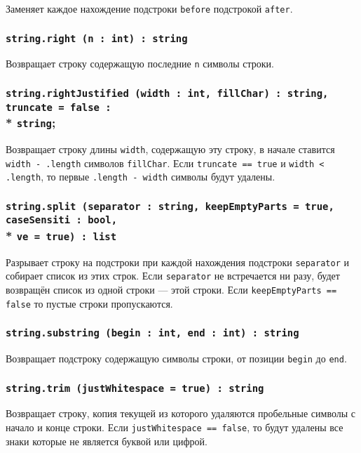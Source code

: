 Заменяет каждое нахождение подстроки \texttt{before} подстрокой \texttt{after}.

\subsubsection{\texttt{string.right (n : int) : string}}

Возвращает строку содержащую последние \texttt{n} символы строки.

\subsubsection{\texttt{string.rightJustified (width : int, fillChar) : string, truncate = false :}\\* \texttt{string};}

Возвращает строку длины \texttt{width}, содержащую эту строку, в начале ставится \texttt{width - .length} символов \texttt{fillChar}. Если \texttt{truncate == true} и \texttt{width < .length}, то первые \texttt{.length - width} символы будут удалены.

\subsubsection{\texttt{string.split (separator : string, keepEmptyParts = true, caseSensiti : bool,}\\* \texttt{ve = true) : list}}

Разрывает строку на подстроки при каждой нахождения подстроки \texttt{separator} и собирает список из этих строк. Если \texttt{separator} не встречается ни разу, будет возвращён список из одной строки — этой строки. Если \texttt{keepEmptyParts == false} то пустые строки пропускаются.

\subsubsection{\texttt{string.substring (begin : int, end : int) : string}}

Возвращает подстроку содержащую символы строки, от позиции \texttt{begin} до \texttt{end}.

\subsubsection{\texttt{string.trim (justWhitespace = true) : string}}

Возвращает строку, копия текущей из которого удаляются пробельные символы с начало и конце строки. Если \texttt{justWhitespace == false}, то будут удалены все знаки которые не является буквой или цифрой.



